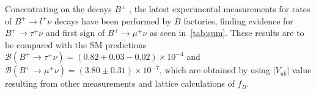 Concentrating on the decays \DIFaddbegin {}\DIFaddend $B^{\pm}$ \DIFdelbegin {}\DIFdelend \DIFaddbegin {}\DIFaddend , the latest experimental measurements for rates of $B^{+}\rightarrow l^{+} \nu$ decays have been performed by $B$ factories, finding evidence for $B^{+}\rightarrow \tau^{+}\nu$ and \DIFaddbegin {}\DIFaddend first sign of $B^{+}\rightarrow \mu^{+}\nu$ as seen in~\autoref{tab:sum}. These results are to be compared with the \gls{SM} predictions $\mathcal{B}(B^{+}\rightarrow \tau^{+}\nu) = (0.82+0.03-0.02)\times10^{-4}$\cite{Charles:2004jd} and $\mathcal{B}(B^{+}\rightarrow \mu^{+}\nu) = (3.80\pm0.31)\times10^{-7}$\cite{Sibidanov:2017vph}, which are obtained by using \DIFaddbegin {}\DIFaddend $|V_{ub}|$ value resulting from other measurements and lattice calculations of $f_{B}$. %



